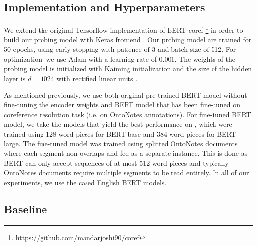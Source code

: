 \documentclass[11pt]{article}
\begin{document}
\subsection{Implementation and Hyperparameters} 

We extend the original Tensorflow implementation of BERT-coref \footnote{\url{https://github.com/mandarjoshi90/coref}} in order to build our probing model with Keras frontend \parencite{chollet2015keras}. Our probing model are trained for 50 epochs, using early stopping with patience of 3 and batch size of 512. For optimization, we use Adam \parencite{adam} with a learning rate of 0.001. The weights of the probing model is initialized with Kaiming initialization \parencite{kaiming} and the size of the hidden layer is $d=1024$ with rectified linear units \parencite{relu}.

As mentioned previously, we use both original pre-trained BERT model without fine-tuning the encoder weights and BERT model that has been fine-tuned on coreference resolution task (i.e. on OntoNotes annotations). For fine-tuned BERT model, we take the models that yield the best performance on \parencite{joshi2019coref}, which were trained using 128 word-pieces for BERT-base and 384 word-pieces for BERT-large. The fine-tuned model was trained using splitted OntoNotes documents where each segment non-overlaps and fed as a separate instance. This is done as BERT can only accept sequences of at most 512 word-pieces and typically OntoNotes documents require multiple segments to be read entirely. In all of our experiments, we use the cased English BERT models.

\subsection{Baseline}
\end{document}
